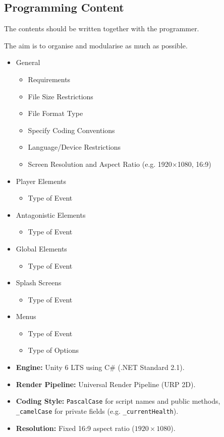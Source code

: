 \subsection{Programming Content}

\begin{guidance}
The contents should be written together with the programmer.

The aim is to organise and modularise as much as possible.

\begin{itemize}[label=\textbullet]
  \item General
  \begin{itemize}[label=$\circ$]
    \item Requirements
    \item File Size Restrictions
    \item File Format Type
    \item Specify Coding Conventions
    \item Language/Device Restrictions
    \item Screen Resolution and Aspect Ratio (e.g. 1920×1080, 16:9)
  \end{itemize}
  \item Player Elements
  \begin{itemize}[label=$\circ$]
    \item Type of Event
  \end{itemize}
  \item Antagonistic Elements
  \begin{itemize}[label=$\circ$]
    \item Type of Event
  \end{itemize}
  \item Global Elements
  \begin{itemize}[label=$\circ$]
    \item Type of Event
  \end{itemize}
  \item Splash Screens
  \begin{itemize}[label=$\circ$]
    \item Type of Event
  \end{itemize}
  \item Menus
  \begin{itemize}[label=$\circ$]
    \item Type of Event
    \item Type of Options
  \end{itemize}
\end{itemize}
\end{guidance}
\begin{itemize}[label=\textbullet]
  \item \textbf{Engine:} Unity 6 LTS using C\# (.NET Standard 2.1).
  \item \textbf{Render Pipeline:} Universal Render Pipeline (URP 2D).
  \item \textbf{Coding Style:} \texttt{PascalCase} for script names and public methods, \texttt{\_camelCase} for private fields (e.g. \texttt{\_currentHealth}).
  \item \textbf{Resolution:} Fixed 16:9 aspect ratio ($1920\times1080$).
\end{itemize}

